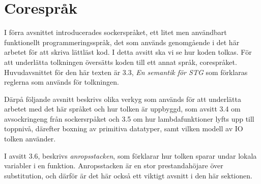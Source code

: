 \documentclass[Rapport]{subfiles}
\begin{document}
\section{Corespråk}


I förra avsnittet introducerades sockerspråket, ett litet men användbart
funktionellt programmeringsspråk, det som används genomgående i det här
arbetet för att skriva lättläst kod.
    I detta avsitt ska vi se hur koden tolkas. För att underlätta
tolkningen översätts koden till ett annat språk, corespråket. 
Huvudavsnittet för den här texten är 3.3, \emph{En semantik för STG}
som förklaras reglerna som används för
tolkningen. 

Därpå följande avsnitt beskrivs olika verkyg som används för att
underlätta arbetet med det här språket och hur tolken är uppbyggd,
som avsitt 3.4 om avsockringeng från sockersrpåket och 3.5 
om hur lambdafunktioner lyfts upp till toppnivå, därefter
boxning av primitiva datatyper, samt vilken modell av IO tolken använder.

I avsitt 3.6, beskrivs \emph{anropsstacken}, som förklarar hur tolken
sparar undar lokala variabler i en funktion. Anropsstacken är en 
stor prestandahöjare över substitution, och därför är det här också ett
viktigt avsnitt i den här sektionen.



%








\end{document}

